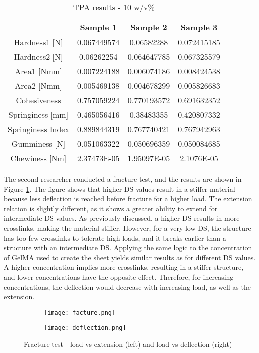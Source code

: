 \begin{table}[ht]
    \centering
    \begin{tabular}{c|ccc}
    \hline
    & Sample 1 & Sample 2 & Sample 3 \\ \hline
    Hardness1 [N] & 0.067449574 & 0.06582288 & 0.072415185 \\ 
    Hardness2 [N] & 0.06262254 & 0.064647785 & 0.067325579 \\ 
    Area1 [Nmm] & 0.007224188 & 0.006074186 & 0.008424538 \\ 
    Area2 [Nmm] & 0.005469138 & 0.004678299 & 0.005826683 \\ 
    Cohesiveness & 0.757059224 & 0.770193572 & 0.691632352 \\ 
    Springiness [mm] & 0.465056416 & 0.38483355 & 0.420807332 \\ 
    Springiness Index & 0.889844319 & 0.767740421 & 0.767942963 \\ 
    Gumminess [N] & 0.051063322 & 0.050696359 & 0.050084685 \\ 
    Chewiness [Nm] & 2.37473E-05 & 1.95097E-05 & 2.1076E-05 \\
    \end{tabular}
    \caption{TPA results - 10 w/v\%}
    \label{tab:inverted-mechanical-test-results-10wv}
\end{table}

The second researcher conducted a fracture test, and the results are shown in Figure \ref{fig:fracture}. The figure shows that higher DS values result in a stiffer material because less deflection is reached before fracture for a higher load. The extension relation is slightly different, as it shows a greater ability to extend for intermediate DS values. As previously discussed, a higher DS results in more crosslinks, making the material stiffer. However, for a very low DS, the structure has too few crosslinks to tolerate high loads, and it breaks earlier than a structure with an intermediate DS. Applying the same logic to the concentration of GelMA used to create the sheet yields similar results as for different DS values. A higher concentration implies more crosslinks, resulting in a stiffer structure, and lower concentrations have the opposite effect. Therefore, for increasing concentrations, the deflection would decrease with increasing load, as well as the extension.

\begin{figure}[H]
    \centering
    \begin{subfigure}[b]{0.45\textwidth}
    \centering
    \texttt{[image: facture.png]}
    \end{subfigure}
    \begin{subfigure}[b]{0.45\textwidth}
    \centering
    \texttt{[image: deflection.png]}
    \end{subfigure}
    \caption{Fracture test - load vs extension (left) and load vs deflection (right)}
    \label{fig:fracture}
\end{figure}